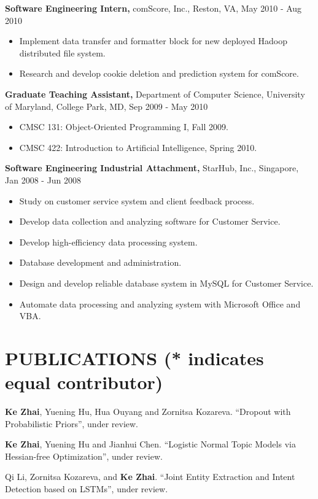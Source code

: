 \documentclass{style/resume}
\begin{document}
\begin{resume}
  {\bf Software Engineering Intern,} comScore, Inc., Reston, VA, May 2010 - Aug 2010
  \begin{itemize}
  \item Implement data transfer and formatter block for new deployed Hadoop distributed file system.
  \item Research and develop cookie deletion and prediction system for comScore.
  \end{itemize}

  {\bf Graduate Teaching Assistant,} Department of Computer Science, University of Maryland, College Park, MD, Sep 2009 - May 2010
  \begin{itemize}
  \item CMSC 131: Object-Oriented Programming I, Fall 2009.
  \item CMSC 422: Introduction to Artificial Intelligence, Spring 2010.
  \end{itemize}
  
  {\bf Software Engineering Industrial Attachment,} StarHub, Inc., Singapore, Jan 2008 - Jun 2008
  \begin{itemize}
  \item Study on customer service system and client feedback process.
  \item Develop data collection and analyzing software for Customer Service.
  \item Develop high-efficiency data processing system.
  \item Database development and administration.
  \item Design and develop reliable database system in MySQL for Customer Service.
  \item Automate data processing and analyzing system with Microsoft Office and VBA.
  \end{itemize}
  
  \section{PUBLICATIONS (* indicates equal contributor)} 
  \vspace{0.1in}

  {\bf Ke Zhai}, Yuening Hu, Hua Ouyang and Zornitsa
  Kozareva. ``Dropout with Probabilistic Priors'', under
  review.

  {\bf Ke Zhai}, Yuening Hu and Jianhui Chen. ``Logistic Normal Topic
  Models via Hessian-free Optimization'', under review.

 Qi Li, Zornitsa Kozareva, and {\bf Ke Zhai}. ``Joint Entity
 Extraction and Intent Detection based on LSTMs'', under review.


\end{resume}
\end{document}
